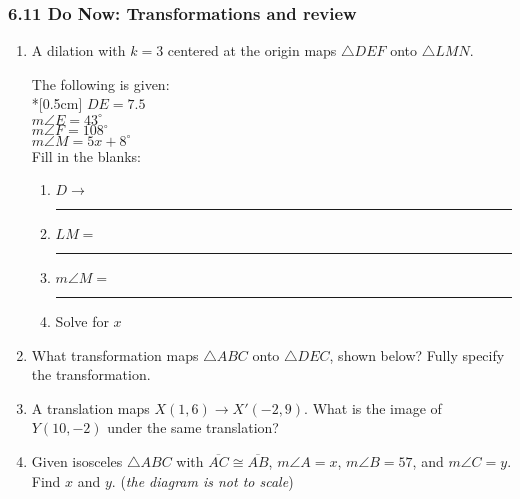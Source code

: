 \documentclass[12pt, twoside]{article}
\begin{document}
\subsubsection*{6.11 Do Now: Transformations and review}
  \begin{enumerate}

  \item A dilation with $k=3$ centered at the origin maps $\triangle DEF$ onto $\triangle LMN$. \vspace{0.5cm}
    \begin{multicols}{2}
    The following is given:\\*[0.5cm]
      $DE=7.5$ \\
      $m\angle E = 43^\circ$ \\
      $m\angle F = 108^\circ$ \\
      $m\angle M = 5x + 8^\circ$ \\
      Fill in the blanks:
      \begin{enumerate}
        \item $D \rightarrow$ \rule{2cm}{0.15mm}
        \item $LM =$ \rule{2cm}{0.15mm}
        \item $m\angle M =$ \rule{2cm}{0.15mm}
        \item Solve for $x$
      \end{enumerate}
    \end{multicols}  \vspace{3cm}

  \item What transformation maps $\triangle ABC$ onto $\triangle DEC$, shown below? Fully specify the transformation. \\[0.25cm]

  \item A translation maps $X(1,6) \rightarrow X'(-2,9)$. What is the image of $Y(10,-2)$ under the same translation?

\newpage
  \item Given isosceles $\triangle ABC$ with $\overline{AC} \cong \overline{AB}$, $m\angle A = x$, $m\angle B = 57$, and $m\angle C=y$. Find $x$ and $y$. \hfill (\emph{the diagram is not to scale})
  \begin{flushright}
  \end{flushright}


\end{enumerate}
\end{document}
